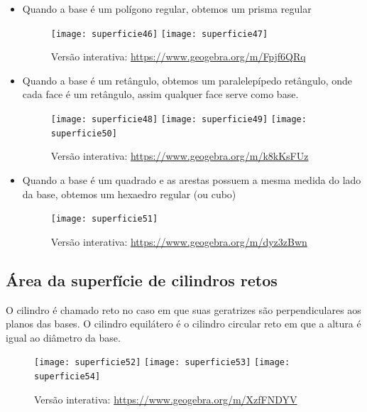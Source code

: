 \begin{itemize}
  \item Quando a base é um polígono regular, obtemos um prisma regular
  \begin{figure}[H]
  \centering

  \texttt{[image: superficie46]}\hspace{.5em}
  \texttt{[image: superficie47]}

  \caption{Versão interativa: \url{https://www.geogebra.org/m/Fpjf6QRq}}
  \end{figure}

  \item Quando a base é um retângulo, obtemos um paralelepípedo retângulo, onde cada face é um retângulo, assim qualquer face serve como base.
  \begin{figure}[H]
  \centering

  \texttt{[image: superficie48]}\hspace{.5em}
  \texttt{[image: superficie49]}\hspace{.5em}
  \texttt{[image: superficie50]}

  \caption{Versão interativa: \url{https://www.geogebra.org/m/k8kKsFUz}}
   \end{figure}

   \item Quando a base é um quadrado e as arestas possuem a mesma medida do lado da base, obtemos um hexaedro regular (ou cubo)

   \begin{figure}[H]
   \centering

   \texttt{[image: superficie51]}


   \caption{Versão interativa: \url{https://www.geogebra.org/m/dyz3zBwn}}
   \end{figure}
\end{itemize}

\subsection{ Área da superfície de cilindros retos}

O cilindro é chamado reto no caso em que suas geratrizes são perpendiculares aos planos das bases. O cilindro equilátero é o cilindro circular reto em que a altura é igual ao diâmetro da base.

\begin{figure}[H]
\centering

\texttt{[image: superficie52]}\hspace{.5em}
\texttt{[image: superficie53]}\hspace{.5em}
\texttt{[image: superficie54]}

\caption{Versão interativa: \url{https://www.geogebra.org/m/XzfFNDYV}}
\end{figure}

